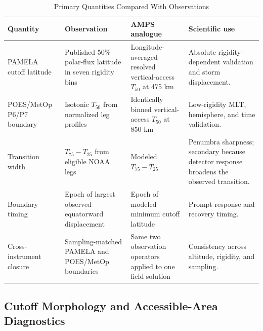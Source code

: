 \begin{table}
\caption{Primary Quantities Compared With Observations}
\label{tab:exp-comparisons}
\centering
\small
\begin{tabular}{p{}p{}p{}p{}}
\toprule
Quantity & Observation & AMPS analogue & Scientific use \\
\midrule
PAMELA cutoff latitude & Published 50\% polar-flux latitude in seven rigidity bins & Longitude-averaged resolved vertical-access $T_{50}$ at 475 km & Absolute rigidity-dependent validation and storm displacement. \\
POES/MetOp P6/P7 boundary & Isotonic $T_{50}$ from normalized leg profiles & Identically binned vertical-access $T_{50}$ at 850 km & Low-rigidity MLT, hemisphere, and time validation. \\
Transition width & $T_{75}-T_{25}$ from eligible NOAA legs & Modeled $T_{75}-T_{25}$ & Penumbra sharpness; secondary because detector response broadens the observed transition. \\
Boundary timing & Epoch of largest observed equatorward displacement & Epoch of modeled minimum cutoff latitude & Prompt-response and recovery timing. \\
Cross-instrument closure & Sampling-matched PAMELA and POES/MetOp boundaries & Same two observation operators applied to one field solution & Consistency across altitude, rigidity, and sampling. \\
\bottomrule
\end{tabular}
\end{table}

\subsection{Cutoff Morphology and Accessible-Area Diagnostics}

